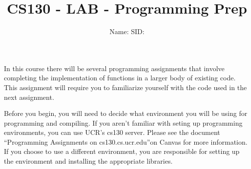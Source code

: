 \documentclass[12pt]{article}
\newcommand{\TODOL}[1]{\textcolor{red}{\underline{\hspace{#1 cm}}}}
\begin{document}
\title{CS130 - LAB - Programming Prep}
\date{}
\author{Name: \TODOL7\qquad\qquad SID: \TODOL4}
\maketitle
\begin{center}
\end{center}

\newcommand{\CM}[1]{\textcolor{blue}{\texttt{#1}}}

In this course there will be several programming assignments that involve completing the implementation of functions in a larger body of existing code. This assignment will require you to familiarize yourself with the code used in the next assignment.

Before you begin, you will need to decide what environment you will be using for programming and compiling. If you aren't familiar with seting up programming environments, you can use UCR's cs130 server. Please see the document ``Programming Assignments on cs130.cs.ucr.edu''on Canvas for more information. If you choose to use a different environment, you are responsible for setting up the environment and installing the appropriate libraries.
\end{document}
